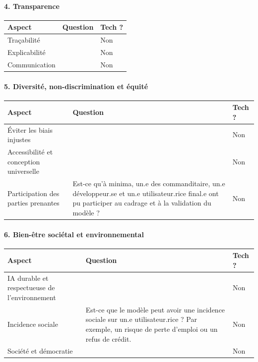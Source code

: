 \documentclass[10pt, french, a4paper]{report}
\begin{document}
\paragraph{4. Transparence}

\begin{center}
  \begin{tabular}{ |p{4cm}|p{6cm}|p{2cm}| } 
    \hline
    Aspect & Question & Tech ? \\
    \hline
    \hline
    Traçabilité &  & Non \\
    \hline
    Explicabilité &  & Non \\
    \hline
    Communication &  & Non \\
    \hline
    
  \end{tabular}
\end{center}

\paragraph{5. Diversité, non-discrimination et équité}

\begin{center}
  \begin{tabular}{ |p{4cm}|p{6cm}|p{2cm}| } 
    \hline
    Aspect & Question & Tech ? \\
    \hline
    \hline
    Éviter les biais injustes &  & Non \\
    \hline
    Accessibilité et conception universelle &  & Non \\
    \hline
    Participation des parties prenantes & Est-ce qu'à minima, un.e des commanditaire, un.e développeur.se et un.e utilisateur.rice final.e ont pu participer au cadrage et à la validation du modèle ? & Non \\
    \hline
    
  \end{tabular}
\end{center}

\paragraph{6. Bien-être sociétal et environnemental}

\begin{center}
  \begin{tabular}{ |p{4cm}|p{6cm}|p{2cm}| } 
    \hline
    Aspect & Question & Tech ? \\
    \hline
    \hline
    IA durable et respectueuse de l’environnement &  & Non \\
    \hline
    Incidence sociale & Est-ce que le modèle peut avoir une incidence sociale sur un.e utilisateur.rice ? Par exemple, un risque de perte d'emploi ou un refus de crédit. & Non \\
    \hline
    Société et démocratie &  & Non \\
    \hline
    
  \end{tabular}
\end{center}
\end{document}

